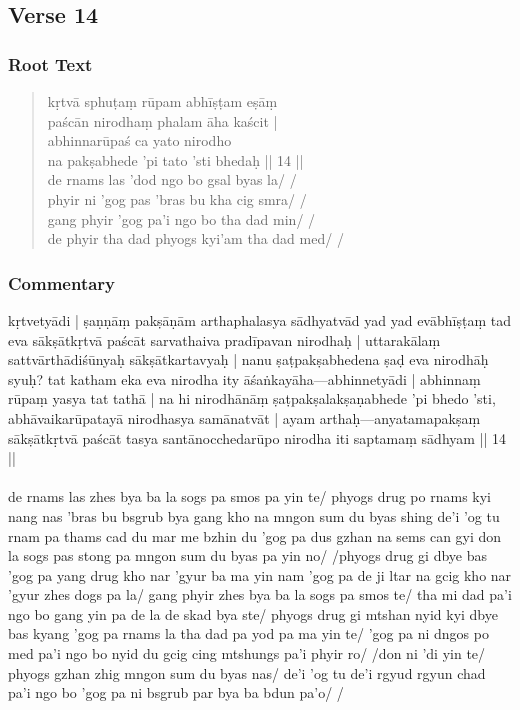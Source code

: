 \documentclass[12pt]{article}
\newcommand{\emdash} {\hspace{0em}—\hspace{0em}}
\begin{document}
\subsection{Verse 14}
\subsubsection{Root Text}
\begin{quote}
	kṛtvā sphuṭaṃ rūpam abhīṣṭam eṣāṃ \\
	paścān nirodhaṃ phalam āha kaścit |\\
	abhinnarūpaś ca yato nirodho \\
	na pakṣabhede 'pi tato 'sti bhedaḥ || 14 ||\\

	de rnams las 'dod ngo bo gsal byas la/ /\\
	phyir ni 'gog pas 'bras bu kha cig smra/ /\\
	gang phyir 'gog pa'i ngo bo tha dad min/ /\\
	de phyir tha dad phyogs kyi'am tha dad med/ / 
\end{quote}

\subsubsection{Commentary}
kṛtvetyādi | ṣaṇṇāṃ pakṣāṇām arthaphalasya sādhyatvād yad yad evābhīṣṭaṃ tad eva sākṣātkṛtvā paścāt sarvathaiva pradīpavan nirodhaḥ | uttarakālaṃ sattvārthādiśūnyaḥ sākṣātkartavyaḥ | nanu ṣaṭpakṣabhedena ṣaḍ eva nirodhāḥ syuḥ? tat katham eka eva nirodha ity āśaṅkayāha\emdash abhinnetyādi | abhinnaṃ rūpaṃ yasya tat tathā | na hi nirodhānāṃ ṣaṭpakṣalakṣaṇabhede 'pi bhedo 'sti, abhāvaikarūpatayā nirodhasya samānatvāt | ayam arthaḥ\emdash anyatamapakṣaṃ sākṣātkṛtvā paścāt tasya santānocchedarūpo nirodha iti saptamaṃ sādhyam || 14 ||\\

\textbf{\TVA}\\
de rnams las zhes bya ba la sogs pa smos pa yin te/ phyogs drug po rnams kyi nang nas 'bras bu bsgrub bya gang kho na mngon sum du byas shing de'i 'og tu rnam pa thams cad du mar me bzhin du 'gog pa dus gzhan na sems can gyi don la sogs pas stong pa mngon sum du byas pa yin no/ /phyogs drug gi dbye bas 'gog pa yang drug kho nar 'gyur ba ma yin nam 'gog pa de ji ltar na gcig kho nar 'gyur zhes dogs pa la/ gang phyir zhes bya ba la sogs pa smos te/ tha mi dad pa'i ngo bo gang yin pa de la de skad bya ste/ phyogs drug gi mtshan nyid kyi dbye bas kyang 'gog pa rnams la tha dad pa yod pa ma yin te/ 'gog pa ni dngos po med pa'i ngo bo nyid du gcig cing mtshungs pa'i phyir ro/ /don ni 'di yin te/ phyogs gzhan zhig mngon sum du byas nas/ de'i 'og tu de'i rgyud rgyun chad pa'i ngo bo 'gog pa ni bsgrub par bya ba bdun pa'o/ /\\
\end{document}
